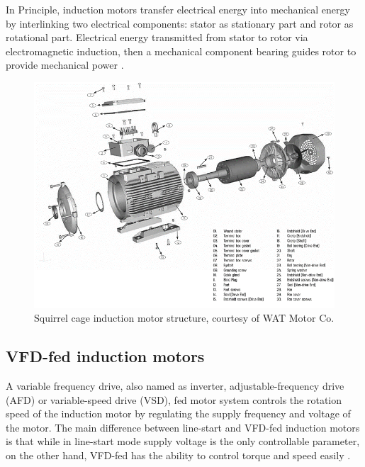 In Principle, induction motors transfer electrical energy into mechanical energy by interlinking two electrical components: stator as stationary part and rotor as rotational part. Electrical energy transmitted from stator to rotor via electromagnetic induction, then a mechanical component bearing guides rotor to provide mechanical power \cite{oliver1992electric,karmakar2016induction}.

\begin{figure}[h]
	\centering
	\includegraphics[width=350pt,keepaspectratio=true]{./fig/watmotor.PNG}
	\caption{Squirrel cage induction motor structure, courtesy of WAT Motor Co.}	
	\label{motor}
\end{figure}
\pagebreak
\subsection{VFD-fed induction motors}

A variable frequency drive, also named as inverter, adjustable-frequency drive (AFD) or variable-speed drive (VSD), fed motor system controls the rotation speed of the induction motor by regulating the supply frequency and voltage of the motor. The main difference between line-start and VFD-fed induction motors is that while in line-start mode supply voltage is the only controllable parameter, on the other hand, VFD-fed has the ability to control torque and speed easily \cite{faiz2017fault}.


